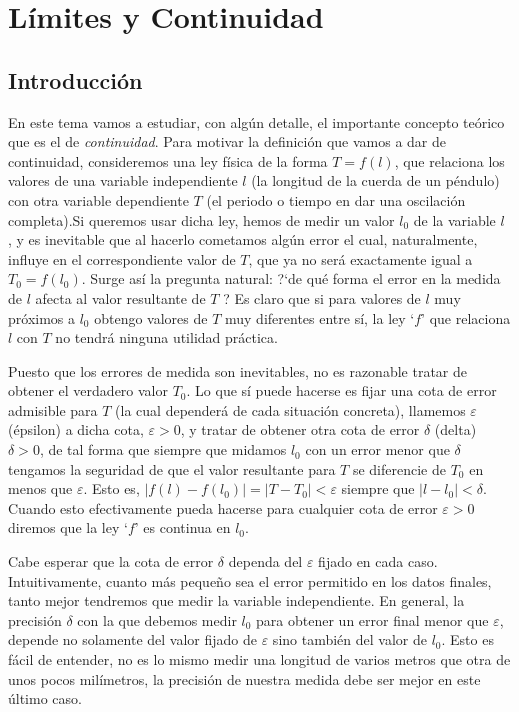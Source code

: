 \chapter{Límites y Continuidad}	
\label{Límites y Continuidad}
	\section{Introducción}
	
		

	En este tema vamos a estudiar, con algún detalle, el importante concepto teórico que es el de \emph{continuidad}. Para motivar la definición que vamos a dar de continuidad, consideremos una ley física de la forma $T = f (l )$, que relaciona los valores de una variable independiente $l$ (la longitud de la cuerda de un péndulo) con otra variable dependiente $T$ (el periodo o tiempo en dar una oscilación completa).Si queremos usar dicha ley, hemos de medir un valor $l_0$ de la variable $l$ , y es inevitable que al hacerlo cometamos algún error el cual, naturalmente, influye en el correspondiente valor de $T$, que ya no será exactamente igual a $T_0 = f(l_0)$. Surge así la pregunta natural: ?`de qué forma el error en la medida de $l$ afecta al valor resultante de $T$ ? Es claro que si para valores de $l$ muy próximos a $l_0$ obtengo valores de $T$ muy diferentes entre sí, la ley `$f$' que relaciona $l$ con $T$ no tendrá ninguna utilidad práctica.

	Puesto que los errores de medida son inevitables, no es razonable tratar de obtener el verdadero valor $T_0$. Lo que sí puede hacerse es fijar una cota de error admisible para $T$ (la cual dependerá de cada situación concreta), llamemos $\varepsilon$ (épsilon) a dicha cota, $\varepsilon > 0$, y tratar de obtener otra cota de error $\delta$ (delta) $\delta > 0$, de tal forma que siempre que midamos $l_0$ con un error menor que $\delta$ tengamos la seguridad de que el valor resultante para $T$ se diferencie de $T_0$ en menos que $\varepsilon$. Esto es, $|f(l )-f(l_0)|=|T-T_0| < \varepsilon$ siempre que $|l-l_0| < \delta$. Cuando esto efectivamente pueda hacerse para cualquier cota de error $\varepsilon > 0$ diremos que la ley `$f$'  es continua en $l_0$.

	Cabe esperar que la cota de error $\delta$ dependa del $\varepsilon$ fijado en cada caso. Intuitivamente, cuanto más pequeño sea el error permitido en los datos finales, tanto mejor tendremos que medir la variable independiente. En general, la precisión $\delta$  con la que debemos medir $l_0$ para obtener un error final menor que $\varepsilon$, depende no solamente del valor fijado de $\varepsilon$ sino también del valor de $l_0$. Esto es fácil de entender, no es lo mismo medir una longitud de varios metros que otra de unos pocos milímetros, la precisión de nuestra medida debe ser mejor en este último caso.

